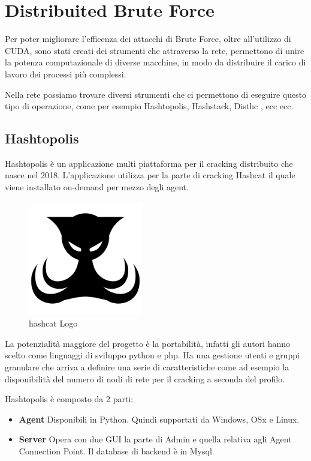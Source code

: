 \chapter{Distribuited Brute Force}

Per poter migliorare l'efficenza dei attacchi di Brute Force, oltre all'utilizzo di CUDA, sono stati creati dei strumenti che attraverso la rete, permettono di unire la potenza computazionale di diverse macchine, in modo da distribuire il carico di lavoro dei processi più complessi.

Nella rete possiamo trovare diversi strumenti che ci permettono di eseguire questo tipo di operazione, come per esempio Hashtopolis, Hashstack, Disthc , ecc ecc.

\section{Hashtopolis}

Hashtopolis è un applicazione multi piattaforma per il cracking distribuito che nasce nel 2018. L’applicazione utilizza per la parte di cracking Hashcat il quale viene installato on-demand per mezzo degli agent. 

\begin{figure}[ht]
    \centering
    \includegraphics[width=50mm]{Immagini/8/hashtopoli_logo.png}
    \caption{hashcat Logo}
\end{figure}

La potenzialità maggiore del progetto è la portabilità, infatti gli autori hanno scelto come linguaggi di sviluppo python e php. Ha una gestione utenti e gruppi granulare che arriva a definire una serie di caratteristiche come ad esempio la disponibilità del numero di nodi di rete per il cracking a seconda del profilo.

Hashtopolis è composto da 2 parti:

\begin{itemize}
    \item \textbf{Agent} Disponibili in Python. Quindi supportati da Windows, OSx e Linux.
    \item \textbf{Server} Opera con due GUI la parte di Admin e quella relativa agli Agent Connection Point. Il database di backend è in Mysql.
\end{itemize}

